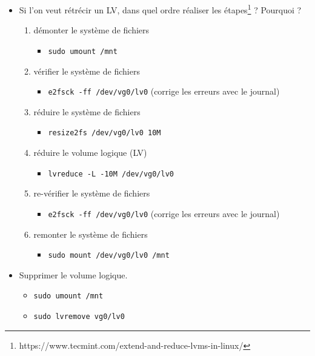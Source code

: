 \documentclass[a4paper]{article}
\begin{document}
\begin{itemize}
\item Si l'on veut rétrécir un LV, dans quel ordre réaliser les étapes\footnote{https://www.tecmint.com/extend-and-reduce-lvms-in-linux/} ? Pourquoi ?
\begin{example}
    \begin{enumerate}
        \item démonter le système de fichiers
        \begin{itemize}
            \item \texttt{sudo umount /mnt}
        \end{itemize}
        \item vérifier le système de fichiers
        \begin{itemize}
            \item \texttt{e2fsck -ff /dev/vg0/lv0} (corrige les erreurs avec le journal)
        \end{itemize}
        \item réduire le système de fichiers
        \begin{itemize}
            \item \texttt{resize2fs /dev/vg0/lv0 10M}
        \end{itemize}
        \item réduire le volume logique (LV)
        \begin{itemize}
            \item \texttt{lvreduce -L -10M /dev/vg0/lv0}
        \end{itemize}
        \item re-vérifier le système de fichiers
        \begin{itemize}
            \item \texttt{e2fsck -ff /dev/vg0/lv0} (corrige les erreurs avec le journal)
        \end{itemize}
        \item remonter le système de fichiers
        \begin{itemize}
            \item \texttt{sudo mount /dev/vg0/lv0 /mnt}
        \end{itemize}
    \end{enumerate}
\end{example}

\item Supprimer le volume logique.
\begin{example}
    \begin{itemize}
        \item \texttt{sudo umount /mnt}
        \item \texttt{sudo lvremove vg0/lv0}
    \end{itemize}
\end{example}

\end{itemize}
\end{document}
